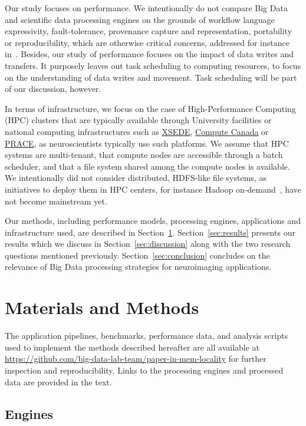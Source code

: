 \documentclass{IEEEtran}
\begin{document}
Our study focuses on performance. We intentionally do not 
compare Big Data and scientific data processing engines on the grounds 
of workflow language expressivity, fault-tolerance, provenance capture 
and representation, portability or reproducibility, which are otherwise 
critical concerns, addressed for instance in~\cite{samba}. Besides, our 
study of performance focuses on the impact of data writes and 
transfers. It purposely leaves out task scheduling to computing 
resources, to focus on the understanding of 
data writes and movement. Task scheduling will be part of our 
discussion, however.

In terms of infrastructure, we focus on the case of High-Performance Computing 
(HPC) clusters that are typically available through University 
facilities or national computing infrastructures such as 
\href{xsede.org}{XSEDE}, \href{http://computecanada.ca}{Compute Canada} 
or \href{http://www.prace-ri.eu}{PRACE}, as neuroscientists typically use such platforms.
 We assume that HPC systems are 
multi-tenant, that compute nodes are accessible through a batch 
scheduler, and that a file system shared among the compute nodes is 
available. We intentionally did not consider distributed, 
HDFS-like file systems, as initiatives to deploy them in HPC 
centers, for instance Hadoop on-demand~\cite{krishnan2011myhadoop}, have not 
become mainstream yet.

Our methods, including performance models, processing engines, 
applications and infrastructure used, are described in 
Section~\ref{sec:methods}. Section~\ref{sec:results} presents our 
results which we discuss in Section~\ref{sec:discussion} along with the 
two research questions mentioned previously. 
Section~\ref{sec:conclusion} concludes on the relevance of Big Data 
processing strategies for neuroimaging applications.

\section{Materials and Methods} %
\label{sec:methods}

The application pipelines, benchmarks, performance data, and analysis scripts used 
to implement the methods described hereafter are all available at 
\url{https://github.com/big-data-lab-team/paper-in-mem-locality} for 
further inspection and reproducibility. Links to the processing engines 
and processed data are provided in the text.

\subsection{Engines} %
\end{document}
